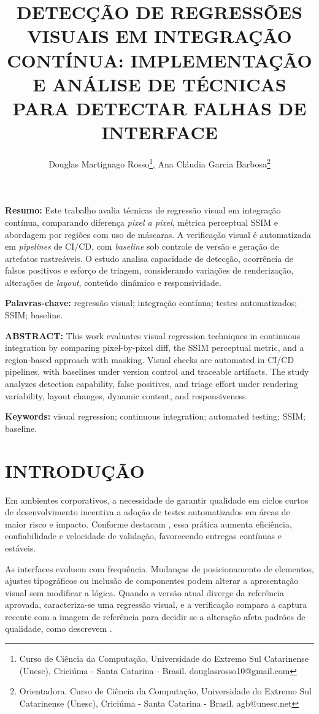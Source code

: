 \documentclass{UNESC}
\title{DETECÇÃO DE REGRESSÕES VISUAIS EM INTEGRAÇÃO CONTÍNUA: IMPLEMENTAÇÃO E ANÁLISE DE TÉCNICAS PARA DETECTAR FALHAS DE INTERFACE}
\author
{
   Douglas Martignago Rosso\footnote{Curso de Ciência da Computação, Universidade do Extremo Sul Catarinense (Unesc), Criciúma - Santa Catarina - Brasil. douglasrosso10@gmail.com},
   Ana Cláudia Garcia Barbosa\footnote{Orientadora. Curso de Ciência da Computação, Universidade do Extremo Sul Catarinense (Unesc), Criciúma - Santa Catarina - Brasil. agb@unesc.net}
}
\begin{document}
\onehalfspacing

\maketitle

\noindent
\textbf{Resumo:} Este trabalho avalia técnicas de regressão visual em integração contínua, comparando diferença \emph{pixel a pixel}, métrica perceptual SSIM e abordagem por regiões com uso de máscaras. A verificação visual é automatizada em \emph{pipelines} de CI/CD, com \emph{baseline} sob controle de versão e geração de artefatos rastreáveis. O estudo analisa capacidade de detecção, ocorrência de falsos positivos e esforço de triagem, considerando variações de renderização, alterações de \emph{layout}, conteúdo dinâmico e responsividade.

\vspace{0.5em}
\noindent
\textbf{Palavras-chave:} regressão visual; integração contínua; testes automatizados; SSIM; baseline.

\vspace{1.0em}
\noindent
\textbf{ABSTRACT:} This work evaluates visual regression techniques in continuous integration by comparing pixel-by-pixel diff, the SSIM perceptual metric, and a region-based approach with masking. Visual checks are automated in CI/CD pipelines, with baselines under version control and traceable artifacts. The study analyzes detection capability, false positives, and triage effort under rendering variability, layout changes, dynamic content, and responsiveness.

\vspace{0.5em}
\noindent
\textbf{Keywords:} visual regression; continuous integration; automated testing; SSIM; baseline.


\section{INTRODUÇÃO}

Em ambientes corporativos, a necessidade de garantir qualidade em ciclos curtos de desenvolvimento incentiva a adoção de testes automatizados em áreas de maior risco e impacto. Conforme destacam , essa prática aumenta eficiência, confiabilidade e velocidade de validação, favorecendo entregas contínuas e estáveis.

As interfaces evoluem com frequência. Mudanças de posicionamento de elementos, ajustes tipográficos ou inclusão de componentes podem alterar a apresentação visual sem modificar a lógica. Quando a versão atual diverge da referência aprovada, caracteriza-se uma regressão visual, e a verificação compara a captura recente com a imagem de referência para decidir se a alteração afeta padrões de qualidade, como descrevem .
\end{document}
